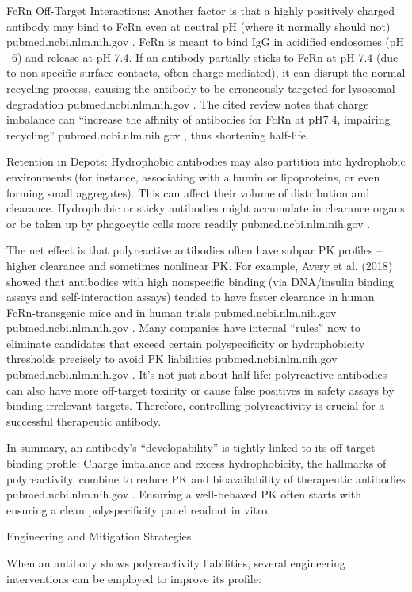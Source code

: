 FcRn Off-Target Interactions: Another factor is that a highly positively charged antibody may bind to FcRn even at neutral pH (where it normally should not)
pubmed.ncbi.nlm.nih.gov
. FcRn is meant to bind IgG in acidified endosomes (pH ~6) and release at pH 7.4. If an antibody partially sticks to FcRn at pH 7.4 (due to non-specific surface contacts, often charge-mediated), it can disrupt the normal recycling process, causing the antibody to be erroneously targeted for lysosomal degradation
pubmed.ncbi.nlm.nih.gov
. The cited review notes that charge imbalance can “increase the affinity of antibodies for FcRn at pH7.4, impairing recycling”
pubmed.ncbi.nlm.nih.gov
, thus shortening half-life.

Retention in Depots: Hydrophobic antibodies may also partition into hydrophobic environments (for instance, associating with albumin or lipoproteins, or even forming small aggregates). This can affect their volume of distribution and clearance. Hydrophobic or sticky antibodies might accumulate in clearance organs or be taken up by phagocytic cells more readily
pubmed.ncbi.nlm.nih.gov
.

The net effect is that polyreactive antibodies often have subpar PK profiles – higher clearance and sometimes nonlinear PK. For example, Avery et al. (2018) showed that antibodies with high nonspecific binding (via DNA/insulin binding assays and self-interaction assays) tended to have faster clearance in human FcRn-transgenic mice and in human trials
pubmed.ncbi.nlm.nih.gov
pubmed.ncbi.nlm.nih.gov
. Many companies have internal “rules” now to eliminate candidates that exceed certain polyspecificity or hydrophobicity thresholds precisely to avoid PK liabilities
pubmed.ncbi.nlm.nih.gov
pubmed.ncbi.nlm.nih.gov
. It’s not just about half-life: polyreactive antibodies can also have more off-target toxicity or cause false positives in safety assays by binding irrelevant targets. Therefore, controlling polyreactivity is crucial for a successful therapeutic antibody.

In summary, an antibody’s “developability” is tightly linked to its off-target binding profile: Charge imbalance and excess hydrophobicity, the hallmarks of polyreactivity, combine to reduce PK and bioavailability of therapeutic antibodies
pubmed.ncbi.nlm.nih.gov
. Ensuring a well-behaved PK often starts with ensuring a clean polyspecificity panel readout in vitro.

Engineering and Mitigation Strategies

When an antibody shows polyreactivity liabilities, several engineering interventions can be employed to improve its profile:

